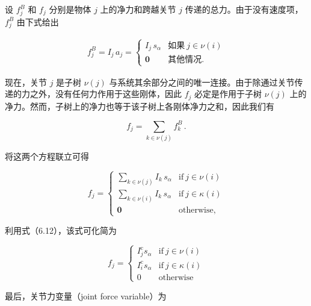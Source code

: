 \documentclass[10pt,a4paper]{book}
\theoremstyle{thmstyle} %
\theoremstyle{defstyle} %
\theoremstyle{prostyle} %
\begin{document}
设 $f_{j}^{B}$ 和 $f_{j}$ 分别是物体 $j$ 上的净力和跨越关节 $j$ 传递的总力。由于没有速度项，$f_{j}^{B}$ 由下式给出



$$
\begin{array}{r} { f _ { j } ^{B} = I _ { j } \, a _ { j } = \left\{ \begin{array}{ll} { I _ { j } \, s _ { \alpha } } & {\text{如果}~ j \in \nu ( i )} \\{ \mathbf { 0 } } & \text{其他情况} . \end{array} \right. } \end{array}
$$



现在，关节 $j$ 是子树 $\nu(j)$ 与系统其余部分之间的唯一连接。由于除通过关节传递的力之外，没有任何力作用于这些刚体，因此 $f_j$ 必定是作用于子树 $\nu(j)$ 上的净力。然而，子树上的净力也等于该子树上各刚体净力之和，因此我们有



$$
f _ { j } = \sum _ { k \in \nu ( j ) } f _ { k } ^{B} \, .
$$



将这两个方程联立可得



$$
f_{j} = \left\{ \begin{array}{ll} { \sum _ { k \in \nu ( j ) } I _ { k } \, s _ { \alpha } } & { \mathrm { i f ~ } j \in \nu ( i ) } \\{ \sum _ { k \in \nu ( i ) } I _ { k } \, s _ { \alpha } } & { \mathrm { i f ~ } j \in \kappa ( i ) } \\{ \mathbf { 0 } } & { \mathrm { o t h e r w i s e } , } \end{array} \right.
$$



利用式（6.12），该式可化简为



$$
f_{j} = \left\{ \begin{array}{ll} { I _ { j } ^{\mathrm { c} } s _ { \alpha } } & { \mathrm { i f ~ } j \in \nu ( i ) } \\{ I _ { i } ^{\mathrm { c} } s _ { \alpha } } & { \mathrm { i f ~ } j \in \kappa ( i ) } \\{ 0 } & { \mathrm { o t h e r w i s e } } \end{array} \right.
$$



最后，关节力变量（joint force variable）为
\end{document}
